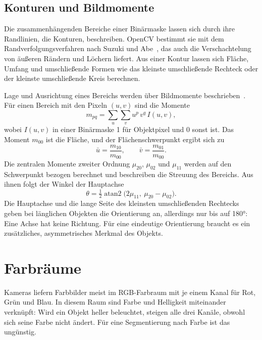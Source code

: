 \subsection{Konturen und Bildmomente}
\label{sec:momente}

Die zusammenhängenden Bereiche einer Binärmaske lassen sich durch ihre Randlinien, die
Konturen, beschreiben. OpenCV bestimmt sie mit dem Randverfolgungsverfahren nach Suzuki und
Abe~\cite{suzuki1985}, das auch die Verschachtelung von äußeren Rändern und Löchern liefert.
Aus einer Kontur lassen sich Fläche, Umfang und umschließende Formen wie das kleinste
umschließende Rechteck oder der kleinste umschließende Kreis berechnen.

Lage und Ausrichtung eines Bereichs werden über Bildmomente beschrieben~\cite{hu1962}. Für
einen Bereich mit den Pixeln $(u, v)$ sind die Momente
\begin{equation}
  m_{pq} = \sum_{u}\sum_{v} u^p\, v^q\, I(u, v) ,
\end{equation}
wobei $I(u, v)$ in einer Binärmaske 1 für Objektpixel und 0 sonst ist. Das Moment $m_{00}$
ist die Fläche, und der Flächenschwerpunkt ergibt sich zu
\begin{equation}
  \bar{u} = \frac{m_{10}}{m_{00}}, \qquad \bar{v} = \frac{m_{01}}{m_{00}} .
\end{equation}
Die zentralen Momente zweiter Ordnung $\mu_{20}$, $\mu_{02}$ und $\mu_{11}$ werden auf den
Schwerpunkt bezogen berechnet und beschreiben die Streuung des Bereichs. Aus ihnen folgt der
Winkel der Hauptachse
\begin{equation}
  \theta = \tfrac{1}{2} \operatorname{atan2}\bigl(2\mu_{11},\ \mu_{20} - \mu_{02}\bigr) .
\end{equation}
Die Hauptachse und die lange Seite des kleinsten umschließenden Rechtecks geben bei
länglichen Objekten die Orientierung an, allerdings nur bis auf \ang{180}: Eine Achse hat keine
Richtung. Für eine eindeutige Orientierung braucht es ein zusätzliches, asymmetrisches Merkmal
des Objekts.

\section{Farbräume}
\label{sec:farbraeume}

Kameras liefern Farbbilder meist im RGB-Farbraum mit je einem Kanal für Rot, Grün und Blau.
In diesem Raum sind Farbe und Helligkeit miteinander verknüpft: Wird ein Objekt heller
beleuchtet, steigen alle drei Kanäle, obwohl sich seine Farbe nicht ändert. Für eine
Segmentierung nach Farbe ist das ungünstig.


